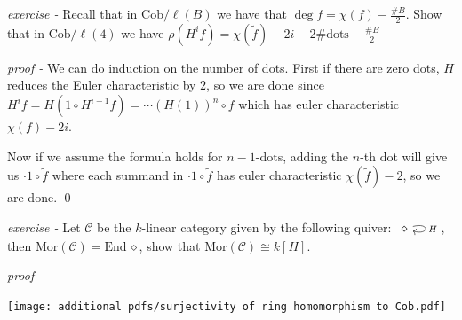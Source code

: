 \documentclass[11pt]{article}
\theoremstyle{definition}
\newcommand{\mor}{\text{Mor}}
\begin{document}

    \emph{exercise - } Recall that in \(\text{Cob}/\ell(B)\) we have that \(\deg f = \chi(f) - \frac{\# B}{2}\). Show that in \(\text{Cob}/\ell(4)\) we have \(\rho(H^if) = \chi(\tilde{f})-2i-2\#\text{dots} - \frac{\#B}{2}\)

    \emph{proof - } We can do induction on the number of dots. First if there are zero dots, \(H\) reduces the Euler characteristic by \(2\), so we are done since \(H^if = H(1 \circ H^{i-1}f) = \cdots (H(1))^{n}\circ f\) which has euler characteristic \(\chi(f) - 2i\).

    Now if we assume the formula holds for \(n-1\)-dots, adding the \(n\)-th dot will give us \(\cdot1 \circ \tilde{f}\) where each summand in \(\cdot 1 \circ \tilde{f}\) has euler characteristic \(\chi(\tilde{f}) - 2\), so we are done. \qed


    \emph{exercise - } Let \(\mathcal{C}\) be the \(k\)-linear category given by the following quiver: \(\begin{tikzcd}
        \diamond\arrow[loop right,"{H}"]
    \end{tikzcd}\), then \(\mor(\mathcal{C}) = \text{End}\,\diamond\), show that \(\mor(\mathcal{C}) \cong k[H]\).

    \emph{proof - } 
    \begin{center}
        \texttt{[image: additional pdfs/surjectivity of ring homomorphism to Cob.pdf]}
    \end{center}
    
\end{document}
